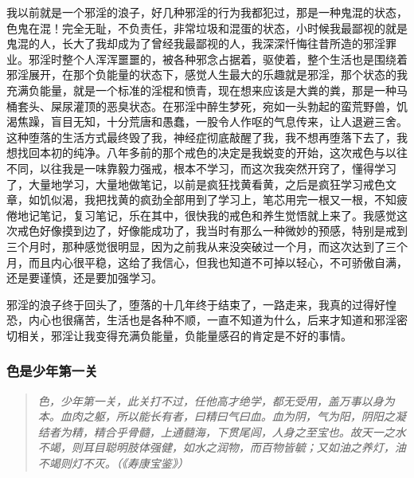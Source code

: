 我以前就是一个邪淫的浪子，好几种邪淫的行为我都犯过，那是一种鬼混的状态，色鬼在混！完全无耻，不负责任，非常垃圾和混蛋的状态，小时候我最鄙视的就是鬼混的人，长大了我却成为了曾经我最鄙视的人，我深深忏悔往昔所造的邪淫罪业。邪淫时整个人浑浑噩噩的，被各种邪念占据着，驱使着，整个生活也是围绕着邪淫展开，在那个负能量的状态下，感觉人生最大的乐趣就是邪淫，那个状态的我充满负能量，就是一个标准的淫棍和愤青，现在想来应该是大粪的粪，那是一种马桶套头、屎尿灌顶的恶臭状态。在邪淫中醉生梦死，宛如一头勃起的蛮荒野兽，饥渴焦躁，盲目无知，十分荒唐和愚蠢，一股令人作呕的气息传来，让人退避三舍。这种堕落的生活方式最终毁了我，神经症彻底敲醒了我，我不想再堕落下去了，我想找回本初的纯净。八年多前的那个戒色的决定是我蜕变的开始，这次戒色与以往不同，以往我是一味靠毅力强戒，根本不学习，而这次我突然开窍了，懂得学习了，大量地学习，大量地做笔记，以前是疯狂找黄看黄，之后是疯狂学习戒色文章，如饥似渴，我把找黄的疯劲全部用到了学习上，笔芯用完一根又一根，不知疲倦地记笔记，复习笔记，乐在其中，很快我的戒色和养生觉悟就上来了。我感觉这次戒色好像摸到边了，好像能成功了，我当时有那么一种微妙的预感，特别是戒到三个月时，那种感觉很明显，因为之前我从来没突破过一个月，而这次达到了三个月，而且内心很平稳，这给了我信心，但我也知道不可掉以轻心，不可骄傲自满，还是要谨慎，还是要加强学习。

邪淫的浪子终于回头了，堕落的十几年终于结束了，一路走来，我真的过得好惶恐，内心也很痛苦，生活也是各种不顺，一直不知道为什么，后来才知道和邪淫密切相关，邪淫让我变得充满负能量，负能量感召的肯定是不好的事情。

\subsubsection{色是少年第一关}

\begin{quote}\it
    色，少年第一关，此关打不过，任他高才绝学，都无受用，盖万事以身为本。血肉之躯，所以能长有者，曰精曰气曰血。血为阴，气为阳，阴阳之凝结者为精，精合乎骨髓，上通髓海，下贯尾闾，人身之至宝也。故天一之水不竭，则耳目聪明肢体强健，如水之润物，而百物皆毓；又如油之养灯，油不竭则灯不灭。（《寿康宝鉴》）
\end{quote}

